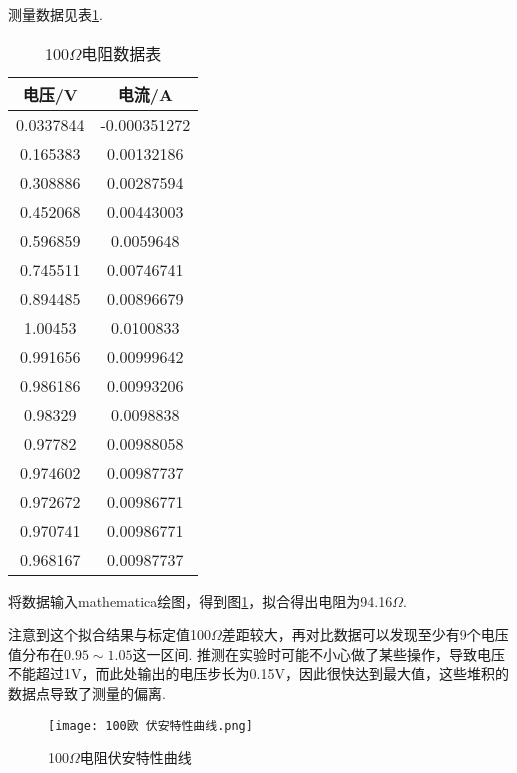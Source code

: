 \documentclass[11pt]{article}
\begin{document}
	测量数据见表\ref{tab: 100}.
	\begin{table}[h!]
		\centering
		\begin{tabular}{|c|c|}
			\hline
			电压/V     & 电流/A        \\ \hline
			0.0337844 & -0.000351272 \\ \hline
			0.165383  & 0.00132186   \\ \hline
			0.308886  & 0.00287594   \\ \hline
			0.452068  & 0.00443003   \\ \hline
			0.596859  & 0.0059648    \\ \hline
			0.745511  & 0.00746741   \\ \hline
			0.894485  & 0.00896679   \\ \hline
			1.00453   & 0.0100833    \\ \hline
			0.991656  & 0.00999642   \\ \hline
			0.986186  & 0.00993206   \\ \hline
			0.98329   & 0.0098838    \\ \hline
			0.97782   & 0.00988058   \\ \hline
			0.974602  & 0.00987737   \\ \hline
			0.972672  & 0.00986771   \\ \hline
			0.970741  & 0.00986771   \\ \hline
			0.968167  & 0.00987737   \\ \hline
		\end{tabular}
		\caption{100$\Omega$电阻数据表}
		\label{tab: 100}
	\end{table}
	
	将数据输入mathematica绘图，得到图\ref{fig:100欧 伏安特性曲线}，拟合得出电阻为94.16$\Omega$.
	
	注意到这个拟合结果与标定值100$\Omega$差距较大，再对比数据可以发现至少有9个电压值分布在$0.95\sim 1.05$这一区间. 推测在实验时可能不小心做了某些操作，导致电压不能超过1V，而此处输出的电压步长为0.15V，因此很快达到最大值，这些堆积的数据点导致了测量的偏离.
	\begin{figure}[h!]
		\centering
		\texttt{[image: 100欧 伏安特性曲线.png]}
		\caption{100$\Omega$电阻伏安特性曲线}
		\label{fig:100欧 伏安特性曲线}
	\end{figure}

	
\end{document}
